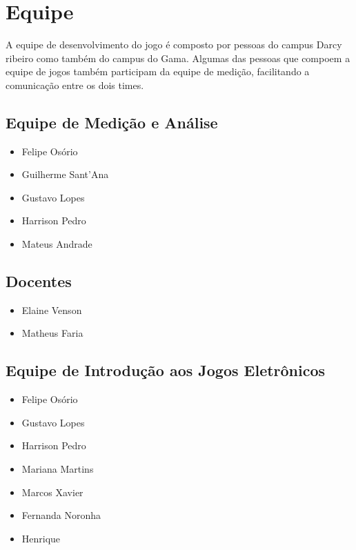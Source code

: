 \chapter{Equipe}
	A equipe de desenvolvimento do jogo é composto por pessoas do campus Darcy ribeiro como também do campus do Gama. Algumas das pessoas que compoem a equipe de jogos também participam da equipe de medição, facilitando a comunicação entre os dois times.

\section{Equipe de Medição e Análise}
	\begin{itemize}
		\item Felipe Osório
		\item Guilherme Sant'Ana
		\item Gustavo Lopes
		\item Harrison Pedro
		\item Mateus Andrade
	\end{itemize}

\section{Docentes}
	\begin{itemize}
		\item Elaine Venson
		\item Matheus Faria
	\end{itemize}

\section{Equipe de Introdução aos Jogos Eletrônicos}
	\begin{itemize}
		\item Felipe Osório
		\item Gustavo Lopes
		\item Harrison Pedro
		\item Mariana Martins
		\item Marcos Xavier
		\item Fernanda Noronha
		\item Henrique
	\end{itemize}